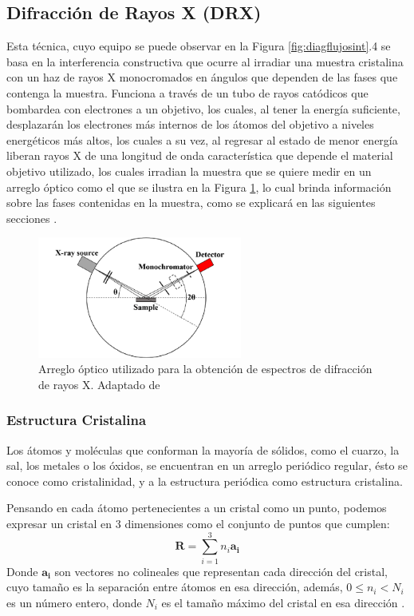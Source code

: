 \documentclass[../main.tex]{subfiles}
\begin{document}
\subsection{Difracción de Rayos X (DRX)}
Esta técnica, cuyo equipo se puede observar en la Figura \ref{fig:diagflujosint}.4 se basa en la interferencia constructiva que ocurre al irradiar una muestra cristalina con un haz de rayos X monocromados en ángulos que dependen de las fases que contenga la muestra. Funciona a través de un tubo de rayos catódicos que bombardea con electrones a un objetivo, los cuales, al tener la energía suficiente, desplazarán los electrones más internos de los átomos del objetivo a niveles energéticos más altos, los cuales a su vez, al regresar al estado de menor energía liberan rayos X de una longitud de onda característica que depende el material objetivo utilizado, los cuales irradian la muestra que se quiere medir en un arreglo óptico como el que se ilustra en la Figura \ref{fig:diagDRX}, lo cual brinda información sobre las fases contenidas en la muestra, como se explicará en las siguientes secciones \cite{dutrowxrd}.
\begin{figure}[H]
    \centering
    \includegraphics[width=0.6\textwidth]{fig/DRXdiag.png}
    \caption{Arreglo óptico utilizado para la obtención de espectros de difracción de rayos X. Adaptado de \cite{Jung2023}}
    \label{fig:diagDRX}
\end{figure}
\subsubsection{Estructura Cristalina}
Los átomos y moléculas que conforman la mayoría de sólidos, como el cuarzo, la sal, los metales o los óxidos, se encuentran en un arreglo periódico regular, ésto se conoce como cristalinidad, y a la estructura periódica como estructura cristalina.

Pensando en cada átomo pertenecientes a un cristal como un punto, podemos expresar un cristal en 3 dimensiones como el conjunto de puntos que cumplen:
$$\pmb{R}=\sum_{i=1}^{3} n_i\pmb{a_i}$$
Donde $\pmb{a_i}$ son vectores no colineales que representan cada dirección del cristal, cuyo tamaño es la separación entre átomos en esa dirección, además, $0\leq n_i<N_i$ es un número entero, donde $N_i$ es el tamaño máximo del cristal en esa dirección \cite{Ashcroft1976}.
\end{document}
